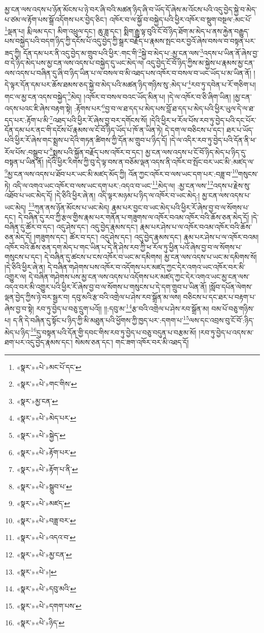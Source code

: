 མྱ་ངན་ལས་འདས་པ་ཉོན་མོངས་པ་ཉེ་བར་ཞི་བའི་མཚན་ཉིད་ཞི་བ་ཡོད་དོ་ཞེས་མ་འོངས་པའི་འདུ་བྱེད་སྐྱེ་བ་མེད་པ་ཙམ་ལ་རྟོག་པས་སྒྲོ་འདོགས་པར་བྱེད་ཅིང་། འཁོར་བ་ལ་སྐྱོ་བ་བསྐྱེད་པའི་ཕྱིར་འཁོར་བ་སྡུག་བསྔལ་:མང་པོ་\footnote{«སྣར་»«པེ་»མང་པོ་དང་}ལྡན་པ། རྨི་ལམ་དང་། མིག་འཕྲུལ་དང་། ཆུ་ཟླ་དང་། སྨིག་རྒྱུ་ལྟ་བུའི་ངོ་བོ་ཉིད་ཐོག་མ་མེད་པ་ནས་རྐྱེན་བརྒྱུད་པས་བསྐྱེད་པའི་བདག་ཉིད་ཀྱི་དངོས་པོ་འདུ་བྱེད་ཀྱི་སྒྲར་བརྗོད་པ་རྣམས་སྤང་བར་བྱའོ་ཞེས་བསལ་བ་བསྟན་པར་ཟད་ཀྱི། དོན་དམ་པར་ནི་འདུ་བྱེད་མ་གྲུབ་པའི་ཕྱིར་:གང་གི་\footnote{«སྣར་»«པེ་»གང་གིས་}སྐྱེ་བ་མེད་པ་:མྱ་ངན་ལས་\footnote{«སྣར་»མྱ་ངན་}འདས་པ་ཡིན་ནོ་ཞེས་བྱ་བ་དེ་ཉིད་མེད་པས་མྱ་ངན་ལས་འདས་པ་བསྐྱེད་དུ་ཡང་མེད་ལ། འདུ་བྱེད་ངོ་བོ་ཉིད་ཀྱིས་མ་སྐྱེས་པ་རྣམས་མྱ་ངན་ལས་འདས་པ་བཞིན་དུ་ཞི་བ་ཉིད་ཡིན་པ་ལ་བསལ་བ་མི་འཐད་པས་འཁོར་བ་བསལ་བ་ཡང་ཡོད་པ་མ་ཡིན་ནོ། །དེ་ལྟར་དོན་དམ་པར་ཆོས་ཐམས་ཅད་སྐྱེ་བ་མེད་པའི་མཚན་ཉིད་གཉིས་སུ་:མེད་པ་\footnote{«སྣར་»«པེ་»མེད་པར་}རབ་ཏུ་དབེན་པ་རོ་གཅིག་པ། གང་ལ་མྱ་ངན་འདས་བསྐྱེད་\footnote{«སྣར་»«པེ་»སྐྱེད་}མེད། །འཁོར་བ་བསལ་བའང་ཡོད་མིན་པ། །དེ་ལ་འཁོར་བ་ཅི་ཞིག་ཡིན། །མྱ་ངན་འདས་པའང་ཇི་ཞེས་བརྟག་སྟེ། :རྟོགས་པར་\footnote{«སྣར་»«པེ་»རྟོག་པར་}བྱ་བ་ལ་ཐ་དད་པ་མེད་པས་བློ་ཐ་དད་པ་མེད་པའི་ཕྱིར་ཡུལ་དེ་ལ་ཐ་དད་པར་:རྟོག་པ་མི་\footnote{«སྣར་»«པེ་»རྟོག་པ་ནི་}འཐད་པའི་ཕྱིར་རོ་ཞེས་བྱ་བར་དགོངས་སོ། །དེའི་ཕྱིར་ཕ་རོལ་པོས་རབ་ཏུ་བྱེད་པའི་དང་པོར་དོན་དམ་པར་ནང་གི་དངོས་པོ་རྣམས་ལ་ངོ་བོ་ཉིད་ཡོད་པ་ཁོ་ན་ཡིན་ཏེ། དེ་དག་ལ་བཅིངས་པ་དང་། ཐར་པ་ཡོད་པའི་ཕྱིར་རོ་ཞེས་གང་སྨྲས་པ་དེའི་གཏན་ཚིགས་ཀྱི་དོན་མ་གྲུབ་པ་ཉིད་དོ། །དེ་ལ་འདིར་རབ་ཏུ་བྱེད་པའི་དོན་ནི་ཕ་རོལ་པོས་:བསྒྲུབ་པ་\footnote{«སྣར་»«པེ་»སྒྲུབ་པ་}སྨྲས་པའི་སྐྱོན་བརྗོད་པས་འཁོར་བ་དང་། མྱ་ངན་ལས་འདས་པ་ངོ་བོ་ཉིད་མེད་པ་ཉིད་དུ་བསྟན་པ་ཡིན་ནོ། །དེའི་ཕྱིར་རིགས་ཀྱི་བུ་དེ་ལྟ་བས་ན་བཅོམ་ལྡན་འདས་ནི་འཁོར་བ་སྤོང་བར་ཡང་མི་:མཛད་ལ་\footnote{«སྣར་»«པེ་»མཛད་}མྱ་ངན་ལས་འདས་པ་ཐོབ་པར་ཡང་མི་མཛད་མོད་ཀྱི། འོན་ཀྱང་འཁོར་བ་ལས་ཡང་དག་པར་:བཟླ་བ་\footnote{«སྣར་»«པེ་»བཟླ་བར་}གསུངས་ཏེ། འདི་ལ་འགའ་ཡང་འཁོར་བ་ལས་ཡང་དག་པར་:འདའ་བ་ཡང་\footnote{«སྣར་»«པེ་»འདའ་བ་}མེད་ལ། :མྱ་ངན་ལས་\footnote{«སྣར་»«པེ་»མྱ་ངན་}འདས་པ་རྗེས་སུ་འཐོབ་པ་ཡང་མེད་དོ། །དེ་ཅིའི་ཕྱིར་ཞེ་ན། འདི་ལྟར་མཉམ་པ་ཉིད་ལ་འཁོར་བ་ཡང་མེད:། མྱ་ངན་ལས་འདས་པ་ཡང་མེད། \footnote{«སྣར་»«པེ་»།  }ཀུན་ནས་ཉོན་མོངས་པ་ཡང་མེད། རྣམ་པར་བྱང་བ་ཡང་མེད་པའི་ཕྱིར་རོ་ཞེས་བྱ་བ་ལ་སོགས་པ་དང་། དེ་བཞིན་དུ་རབ་ཀྱི་རྩལ་གྱིས་རྣམ་པར་གནོན་པ་གཟུགས་ལ་འཁོར་བའམ་འཁོར་བའི་ཆོས་ཅན་མེད་དོ། །དེ་བཞིན་དུ་ཚོར་བ་དང་། འདུ་ཤེས་དང་། འདུ་བྱེད་རྣམས་དང་། རྣམ་པར་ཤེས་པ་ལ་འཁོར་བའམ་འཁོར་བའི་ཆོས་ཅན་མེད་དོ། །གཟུགས་དང་། ཚོར་བ་དང་། འདུ་ཤེས་དང་། འདུ་བྱེད་རྣམས་དང་། རྣམ་པར་ཤེས་པ་ལ་འཁོར་བའམ། འཁོར་བའི་ཆོས་ཅན་དག་མེད་པ་གང་ཡིན་པ་དེ་ནི་ཤེས་རབ་ཀྱི་ཕ་རོལ་ཏུ་ཕྱིན་པའོ་ཞེས་བྱ་བ་ལ་སོགས་པ་གསུངས་པ་དང་། དེ་བཞིན་དུ་ཚངས་པ་ངས་འཁོར་བ་ཡང་མ་དམིགས། མྱ་ངན་ལས་འདས་པ་ཡང་མ་དམིགས་སོ། །དེ་ཅིའི་ཕྱིར་ཞེ་ན། དེ་བཞིན་གཤེགས་པས་འཁོར་བ་འདོགས་པར་མཛད་ཀྱང་དེར་འགའ་ཡང་འཁོར་བར་མི་འགྱུར་ལ། དེ་བཞིན་གཤེགས་པས་མྱ་ངན་ལས་འདས་པ་འདོགས་པར་མཛད་ཀྱང་དེར་འགའ་ཡང་མྱ་ངན་ལས་འདའ་བར་མི་འགྱུར་པའི་ཕྱིར་རོ་ཞེས་བྱ་བ་ལ་སོགས་པ་གསུངས་པ་དེ་དག་གྲུབ་པ་ཡིན་ནོ། །སློབ་དཔོན་ལེགས་ལྡན་བྱེད་ཀྱིས་ཉེ་བར་སྦྱར་བ། དབུ་མའི་རྩ་བའི་འགྲེལ་པ་ཤེས་རབ་སྒྲོན་མ་ལས། བཅིངས་པ་དང་ཐར་པ་བརྟག་པ་ཞེས་བྱ་བ་སྟེ། རབ་ཏུ་བྱེད་པ་བཅུ་དྲུག་པའོ།། །།:དབུ་མ་\footnote{«སྣར་»«པེ་»དབུ་མའི་}རྩ་བའི་འགྲེལ་པ་ཤེས་རབ་སྒྲོན་མ། བམ་པོ་བཅུ་གཉིས་པ། ད་ནི་དེ་བཞིན་དུ་སྟོང་པ་ཉིད་ཀྱི་མི་མཐུན་པའི་ཕྱོགས་ཀྱི་ཁྱད་པར་:དགག་པ་\footnote{«སྣར་»«པེ་»དགག་པས་}ལས་དང་འབྲས་བུ་ངོ་བོ་:ཉིད་མེད་པ་ཉིད་\footnote{«སྣར་»«པེ་»ཉིད་}དུ་བསྟན་པའི་དོན་གྱི་དབང་གིས་རབ་ཏུ་བྱེད་པ་བཅུ་བདུན་པ་བརྩམ་མོ། །རབ་ཏུ་བྱེད་པ་འདས་མ་ཐག་པར་འདུ་བྱེད་རྣམས་དང་། སེམས་ཅན་དང་། གང་ཟག་འཁོར་བར་མི་འཐད་དོ། 